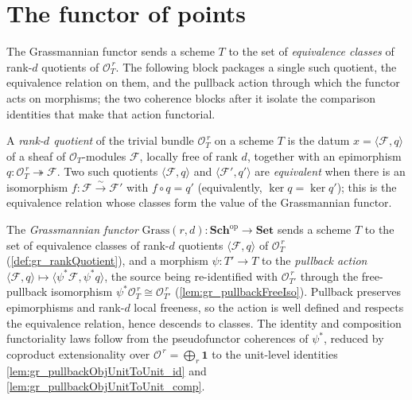 \section{The functor of points}
\label{sec:grquot_functor}

The Grassmannian functor sends a scheme \(T\) to the set of \emph{equivalence classes} of
rank-\(d\) quotients of \(\mathcal{O}_T^{\,r}\). The following block packages a single such
quotient, the equivalence relation on them, and the pullback action through which the
functor acts on morphisms; the two coherence blocks after it isolate the comparison
identities that make that action functorial.

\begin{definition}\leanok
  \label{def:gr_rankQuotient}
  A \emph{rank-\(d\) quotient} of the trivial bundle \(\mathcal{O}_T^{\,r}\) on a scheme
  \(T\) is the datum \(x = \langle \mathcal{F}, q\rangle\) of a sheaf of
  \(\mathcal{O}_T\)-modules \(\mathcal{F}\), locally free of rank \(d\), together with an
  epimorphism \(q : \mathcal{O}_T^{\,r} \twoheadrightarrow \mathcal{F}\). Two such quotients
  \(\langle \mathcal{F}, q\rangle\) and \(\langle \mathcal{F}', q'\rangle\) are
  \emph{equivalent} when there is an isomorphism \(f : \mathcal{F} \xrightarrow{\sim}
  \mathcal{F}'\) with \(f \circ q = q'\) (equivalently, \(\ker q = \ker q'\)); this is the
  equivalence relation whose classes form the value of the Grassmannian functor.
\end{definition}

\begin{definition}\leanok
  \label{def:grassmannian_functor}
  The \emph{Grassmannian functor} \(\mathrm{Grass}(r,d) : \mathbf{Sch}^{\mathrm{op}} \to
  \mathbf{Set}\) sends a scheme \(T\) to the set of equivalence classes of rank-\(d\)
  quotients \(\langle \mathcal{F}, q\rangle\) of \(\mathcal{O}_T^{\,r}\)
  (\cref{def:gr_rankQuotient}), and a morphism \(\psi : T' \to T\) to the \emph{pullback
  action} \(\langle \mathcal{F}, q\rangle \mapsto \langle \psi^{*}\mathcal{F}, \psi^{*}q\rangle\),
  the source being re-identified with \(\mathcal{O}_{T'}^{\,r}\) through the free-pullback
  isomorphism \(\psi^{*}\mathcal{O}_T^{\,r} \cong \mathcal{O}_{T'}^{\,r}\)
  (\cref{lem:gr_pullbackFreeIso}). Pullback preserves epimorphisms and rank-\(d\) local
  freeness, so the action is well defined and respects the equivalence relation, hence
  descends to classes. The identity and composition functoriality laws follow from the
  pseudofunctor coherences of \(\psi^{*}\), reduced by coproduct extensionality over
  \(\mathcal{O}^{\,r} = \bigoplus_r \mathbf{1}\) to the unit-level identities
  \cref{lem:gr_pullbackObjUnitToUnit_id} and \cref{lem:gr_pullbackObjUnitToUnit_comp}.
\end{definition}


